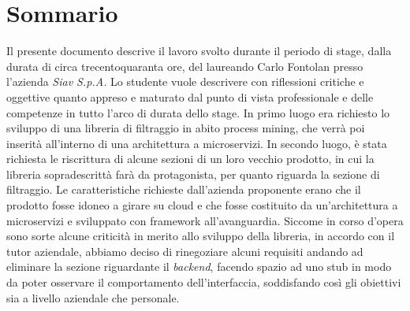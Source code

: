 
\cleardoublepage
{}
{}
\begingroup
\let\clearpage\relax
\let\cleardoublepage\relax
\let\cleardoublepage\relax

\chapter*{Sommario}

Il presente documento descrive il lavoro svolto durante il periodo di stage, dalla durata di circa trecentoquaranta ore, del laureando Carlo Fontolan presso l'azienda \textit{Siav S.p.A.}
Lo studente vuole descrivere con riflessioni critiche e oggettive quanto appreso e maturato dal punto di vista professionale e delle competenze in tutto l'arco di durata dello stage.
In primo luogo era richiesto lo sviluppo di una libreria di filtraggio in abito process mining, che verrà poi inserità all'interno di una architettura a microservizi.
In secondo luogo, è stata richiesta le riscrittura di alcune sezioni di un loro vecchio prodotto, in cui la libreria sopradescrittà farà da protagonista, per quanto riguarda la sezione di filtraggio. Le caratteristiche richieste dall’azienda proponente erano che il prodotto fosse idoneo a girare su cloud e che fosse costituito da un’architettura a microservizi e sviluppato con framework all'avanguardia.
Siccome in corso d'opera sono sorte alcune criticità in merito allo sviluppo della libreria, in accordo con il tutor aziendale, abbiamo deciso di rinegoziare alcuni requisiti andando ad eliminare la sezione riguardante il  \textit{backend}, facendo spazio ad uno stub in modo da poter osservare il comportamento dell'interfaccia, soddisfando così gli obiettivi sia a livello aziendale che personale. 


%
%

\endgroup			

\vfill

